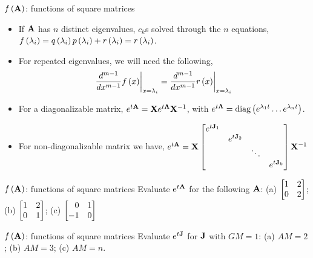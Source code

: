 \documentclass[aspectratio=169]{beamer}
\def\mf{\ensuremath\mathbf}
\def\lp{\ensuremath\left(}
\def\rp{\ensuremath\right)}
\def\bmx{\ensuremath\begin{bmatrix*}[r]}
\def\emx{\ensuremath\end{bmatrix*}}
\def\bmxc{\ensuremath\begin{bmatrix*}[c]}
\begin{document}
\begin{frame}[t]{$f\lp\mf{A}\rp$: functions of square matrices}
\begin{itemize}
    \item If $\mf{A}$ has $n$ distinct eigenvalues, $c_k$s solved through the $n$ equations, $f\lp \lambda_i\rp = q\lp\lambda_i\rp p\lp\lambda_i\rp + r\lp \lambda_i\rp = r\lp \lambda_i\rp$.

    \item For repeated eigenvalues, we will need the following,
    \[ \frac{d^{m-1}}{dx^{m-1}}f\lp x\rp\biggr\rvert_{x=\lambda_i} = \frac{d^{m-1}}{dx^{m-1}}r\lp x\rp\biggr\rvert_{x=\lambda_i} \]
    
    \item For a diagonalizable matrix, $e^{t\mf{A}} = \mf{X}e^{t\mf{\Lambda}}\mf{X}^{-1}$, with $e^{t\mf{\Lambda}} = \text{diag}\lp e^{\lambda_1t} \ldots e^{\lambda_nt}\rp$.

    \item For non-diagonalizable matrix we have,
    $e^{t\mf{A}} = \mf{X}\bmxc e^{t\mf{J}_1} &  &  &\\
          & e^{t\mf{J}_2} &  &\\
          & & \ddots &\\
          &  &  & e^{t\mf{J}_k}\emx\mf{X}^{-1}$
\end{itemize}
\end{frame}


\begin{frame}[t]{$f\lp\mf{A}\rp$: functions of square matrices}
Evaluate $e^{t\mf{A}}$ for the following $\mf{A}$: (a) $\bmx 1 & 2 \\ 0 & 2\emx$; (b) $\bmx 1 & 2 \\ 0 & 1\emx$; (c) $\bmx 0 & 1\\ -1 & 0\emx$
\end{frame}


\begin{frame}[t]{$f\lp\mf{A}\rp$: functions of square matrices}
Evaluate $e^{t\mf{J}}$ for $\mf{J}$ with $GM=1$: (a) $AM=2$; (b) $AM=3$; (c) $AM=n$.
\end{frame}
\end{document}
